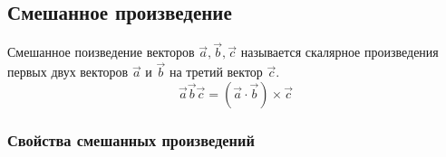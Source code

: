 \subsection{Смешанное произведение}

\begin{definition}
  Смешанное поизведение векторов $\vec{a}, \vec{b}, \vec{c}$ называется скалярное произведения первых двух векторов $\vec{a}$ и $\vec{b}$ на третий вектор $\vec{c}$.
  \[
  \vec{a} \vec{b} \vec{c} = (\vec{a} \cdot \vec{b}) \times \vec{c}
  \] 
\end{definition}

\subsubsection{Свойства смешанных произведений}

